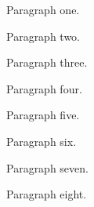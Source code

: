 \hsize=4in
\vsize=72pt
\noindent Paragraph one.\par
\noindent Paragraph two.\par
\noindent Paragraph three.\par
\noindent Paragraph four.\par
\noindent Paragraph five.\par
\noindent Paragraph six.\par
\noindent Paragraph seven.\par
\noindent Paragraph eight.\par
\bye
